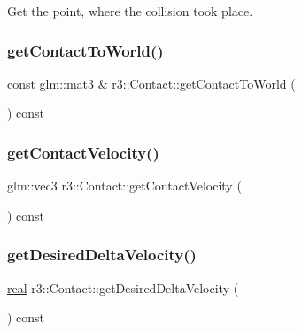 Get the point, where the collision took place. \mbox{\label{classr3_1_1_contact_a4e9692d870bdba44ff6b627b8c6c6e30}} 
\subsubsection{\texorpdfstring{get\+Contact\+To\+World()}{getContactToWorld()}}
{\footnotesize\ttfamily const glm\+::mat3 \& r3\+::\+Contact\+::get\+Contact\+To\+World (\begin{DoxyParamCaption}{ }\end{DoxyParamCaption}) const}

\mbox{\label{classr3_1_1_contact_a733cdbf54fe22bdaaa55a55868ad14ac}} 
\subsubsection{\texorpdfstring{get\+Contact\+Velocity()}{getContactVelocity()}}
{\footnotesize\ttfamily glm\+::vec3 r3\+::\+Contact\+::get\+Contact\+Velocity (\begin{DoxyParamCaption}{ }\end{DoxyParamCaption}) const}

\mbox{\label{classr3_1_1_contact_aff234679aa4302b69b8dd101eb969705}} 
\subsubsection{\texorpdfstring{get\+Desired\+Delta\+Velocity()}{getDesiredDeltaVelocity()}}
{\footnotesize\ttfamily \mbox{\hyperlink{namespacer3_ab2016b3e3f743fb735afce242f0dc1eb}{real}} r3\+::\+Contact\+::get\+Desired\+Delta\+Velocity (\begin{DoxyParamCaption}{ }\end{DoxyParamCaption}) const}

